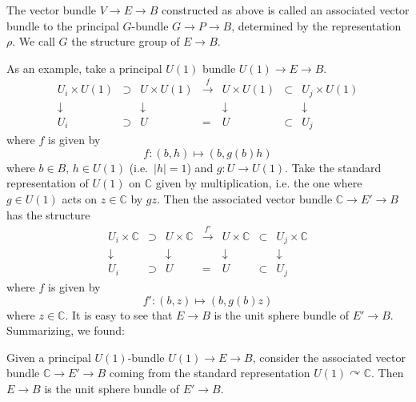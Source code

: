 \documentclass[12pt]{article}
\numberwithin{equation}{section}
\theoremstyle{remark}
\def\bC{\mathbb{C}}
\begin{document}
\begin{definition}
  The vector bundle $V\to E\to B$ constructed as above is called 
  an associated vector bundle to the principal $G$-bundle $G\to P\to B$,
  determined by the representation $\rho$.
  We call $G$ the structure group of $E\to B$.
\end{definition}

As an example, take a principal $U(1)$ bundle $U(1)\to E\to B$.
\begin{equation}
  \begin{array}{cccccccc}
    U_i \times U(1) &\supset& U \times U(1) & \xrightarrow{f } & 
    U \times U(1) & \subset & U_j\times U(1) \\
    \downarrow & & \downarrow & & \downarrow & & \downarrow \\
    U_i & \supset & U  & = & U  & \subset & U_j
  \end{array}
\end{equation}
where $f $ is given by \begin{equation}
   f : (b,h) \mapsto (b, g(b)h)
   \label{eq:U1-transition-function}
\end{equation} where $b\in B$, $h\in U(1)$ (i.e.~$|h|=1$) and $g: U\to U(1)$.
Take the standard representation of $U(1)$ on $\bC$ given by multiplication,
i.e. the one where $g\in U(1)$ acts on $z\in \bC$ by $gz$.
Then the associated vector bundle $\bC\to E'\to B$ has the structure 
\begin{equation}
  \begin{array}{cccccccc}
    U_i \times \bC &\supset& U \times \bC & \xrightarrow{f' } & 
    U \times \bC & \subset & U_j\times \bC \\
    \downarrow & & \downarrow & & \downarrow & & \downarrow \\
    U_i & \supset & U  & = & U  & \subset & U_j
  \end{array}
\end{equation}
where $f $ is given by \begin{equation}
   f' : (b,z) \mapsto (b, g(b)z)
   \label{eq:line-bundle-transition-function}
\end{equation} where $z\in \bC$.
It is easy to see that $E\to B$ is the unit sphere bundle of $E'\to B$.
Summarizing, we found:
\begin{proposition}
  Given a principal $U(1)$-bundle $U(1)\to E\to B$,
  consider the associated vector bundle $\bC\to E'\to B$
  coming from the standard representation $U(1)\curvearrowright \bC$.
  Then $E\to B$ is the unit sphere bundle of $E'\to B$.
\end{proposition}
\end{document}
